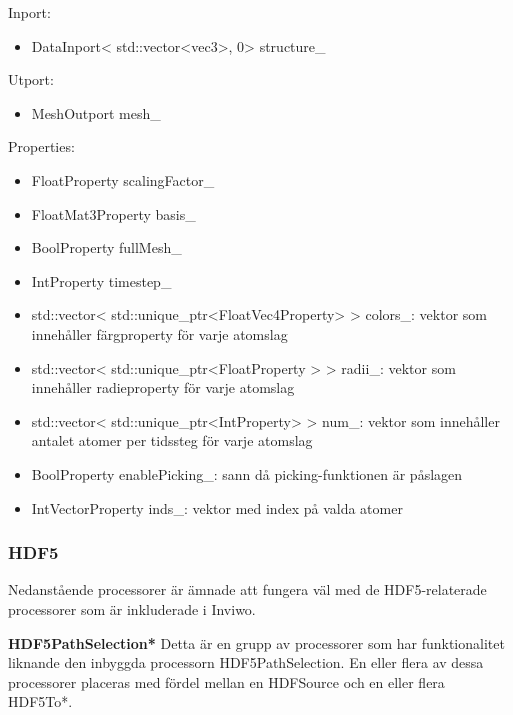 \documentclass[10pt,oneside,swedish]{article}
\providecommand{\tightlist}{%
  \setlength{\itemsep}{0pt}\setlength{\parskip}{0pt}}
\begin{document}
Inport:

\begin{itemize}
\tightlist
\item
  DataInport\textless{} std::vector\textless{}vec3\textgreater{},
  0\textgreater{} structure\_
\end{itemize}

Utport:

\begin{itemize}
\tightlist
\item
  MeshOutport mesh\_
\end{itemize}

Properties:

\begin{itemize}
\tightlist
\item
  FloatProperty scalingFactor\_
\item
  FloatMat3Property basis\_
\item
  BoolProperty fullMesh\_
\item
  IntProperty timestep\_
\item
  std::vector\textless{}
  std::unique\_ptr\textless{}FloatVec4Property\textgreater{}
  \textgreater{} colors\_: vektor som innehåller färgproperty för varje
  atomslag
\item
  std::vector\textless{} std::unique\_ptr\textless{}FloatProperty
  \textgreater{} \textgreater{} radii\_: vektor som innehåller
  radieproperty för varje atomslag
\item
  std::vector\textless{}
  std::unique\_ptr\textless{}IntProperty\textgreater{} \textgreater{}
  num\_: vektor som innehåller antalet atomer per tidssteg för varje
  atomslag
\item
  BoolProperty enablePicking\_: sann då picking-funktionen är påslagen
\item
  IntVectorProperty inds\_: vektor med index på valda atomer
\end{itemize}

\subsubsection{HDF5}\label{hdf5}

Nedanstående processorer är ämnade att fungera väl med de
HDF5-relaterade processorer som är inkluderade i Inviwo.

\textbf{HDF5PathSelection*} Detta är en grupp av processorer som har
funktionalitet liknande den inbyggda processorn HDF5PathSelection. En
eller flera av dessa processorer placeras med fördel mellan en HDFSource
och en eller flera HDF5To*.
\end{document}
